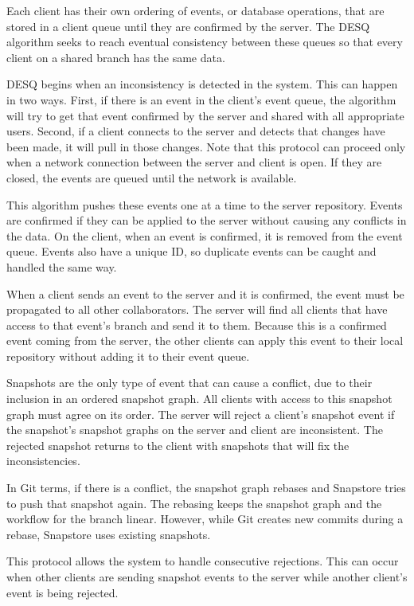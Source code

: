 Each client has their own ordering of events, or database operations, that are stored in a client queue until they are confirmed by the server. The DESQ algorithm seeks to reach eventual consistency between these queues so that every client on a shared branch has the same data.

DESQ begins when an inconsistency is detected in the system. This can happen in two ways. First, if there is an event in the client's event queue, the algorithm will try to get that event confirmed by the server and shared with all appropriate users. Second, if a client connects to the server and detects that changes have been made, it will pull in those changes. Note that this protocol can proceed only when a network connection between the server and client is open. If they are closed, the events are queued until the network is available.

This algorithm pushes these events one at a time to the server repository. Events are confirmed if they can be applied to the server without causing any conflicts in the data. On the client, when an event is confirmed, it is removed from the event queue. Events also have a unique ID, so duplicate events can be caught and handled the same way.

When a client sends an event to the server and it is confirmed, the event must be propagated to all other collaborators. The server will find all clients that have access to that event's branch and send it to them. Because this is a confirmed event coming from the server, the other clients can apply this event to their local repository without adding it to their event queue.

Snapshots are the only type of event that can cause a conflict, due to their inclusion in an ordered snapshot graph. All clients with access to this snapshot graph must agree on its order. The server will reject a client's snapshot event if the snapshot's snapshot graphs on the server and client are inconsistent. The rejected snapshot returns to the client with snapshots that will fix the inconsistencies.

In Git terms, if there is a conflict, the snapshot graph rebases and Snapstore tries to push that snapshot again. The rebasing keeps the snapshot graph and the workflow for the branch linear. However, while Git creates new commits during a rebase, Snapstore uses existing snapshots.

This protocol allows the system to handle consecutive rejections. This can occur when other clients are sending snapshot events to the server while another client's event is being rejected.


